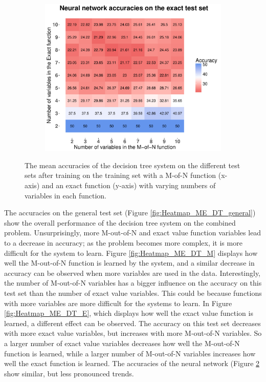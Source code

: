 \documentclass[letterpaper]{article} %
\begin{document}
\begin{figure}
   \begin{subfigure}[t]{0.45\textwidth}
        \includegraphics[width = 1 \linewidth]{Figures/Heatmap_ME_NN_E.pdf}
		\caption{}       
        \label{fig:Heatmap_ME_NN_E}
    \end{subfigure}%
    \caption{The mean accuracies of the decision tree system on the different test sets after training on the training set with a M-of-N function (x-axis) and an exact function (y-axis) with varying numbers of variables in each function.}
    \label{fig:Heatmap_NN_ME}
\end{figure}

The accuracies on the general test set (Figure \ref{fig:Heatmap_ME_DT_general}) show the overall performance of the decision tree system on the combined problem. Unsurprisingly, more M-out-of-N and exact value function variables lead to a decrease in accuracy; as the problem becomes more complex, it is more difficult for the system to learn. Figure \ref{fig:Heatmap_ME_DT_M} displays how well the M-out-of-N function is learned by the system, and a similar decrease in accuracy can be observed when more variables are used in the data. Interestingly, the number of M-out-of-N variables has a bigger influence on the accuracy on this test set than the number of exact value variables. This could be because functions with more variables are more difficult for the systems to learn. In Figure \ref{fig:Heatmap_ME_DT_E}, which displays how well the exact value function is learned, a different effect can be observed. The accuracy on this test set decreases with more exact value variables, but increases with more M-out-of-N variables. So a larger number of
exact value variables decreases how well the M-out-of-N function is learned, while a larger number of M-out-of-N variables increases how well the exact function is learned. The accuracies of the neural network (Figure \ref{fig:Heatmap_NN_ME} show similar, but less pronounced trends.
\end{document}
